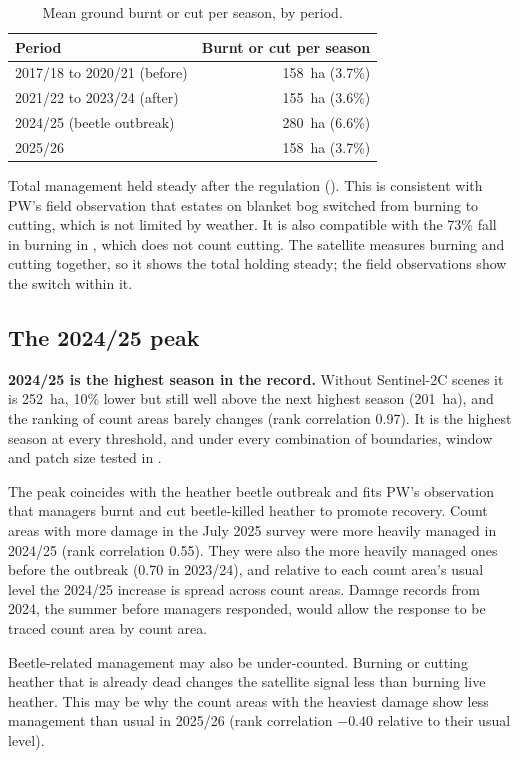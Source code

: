 \documentclass[11pt,a4paper]{article}
\begin{document}
\begin{table}[htbp]
\centering
\caption{Mean ground burnt or cut per season, by period.}\label{tab:regulation}
\small
\begin{tabular}{lr}
\toprule
Period & Burnt or cut per season \\
\midrule
2017/18 to 2020/21 (before) & 158~ha (3.7\%) \\
2021/22 to 2023/24 (after) & 155~ha (3.6\%) \\
2024/25 (beetle outbreak) & 280~ha (6.6\%) \\
2025/26 & 158~ha (3.7\%) \\
\bottomrule
\end{tabular}
\end{table}

Total management held steady after the regulation (). This is consistent with PW's field observation that estates on blanket bog switched from burning to cutting, which is not limited by weather. It is also compatible with the 73\% fall in burning in \citet{shewring2024}, which does not count cutting. The satellite measures burning and cutting together, so it shows the total holding steady; the field observations show the switch within it.

\subsection{The 2024/25 peak}\label{sec:2024}

\textbf{2024/25 is the highest season in the record.} Without Sentinel-2C scenes it is 252~ha, 10\% lower but still well above the next highest season (201~ha), and the ranking of count areas barely changes (rank correlation 0.97). It is the highest season at every threshold, and under every combination of boundaries, window and patch size tested in .

The peak coincides with the heather beetle outbreak and fits PW's observation that managers burnt and cut beetle-killed heather to promote recovery. Count areas with more damage in the July 2025 survey were more heavily managed in 2024/25 (rank correlation 0.55). They were also the more heavily managed ones before the outbreak (0.70 in 2023/24), and relative to each count area's usual level the 2024/25 increase is spread across count areas. Damage records from 2024, the summer before managers responded, would allow the response to be traced count area by count area.

Beetle-related management may also be under-counted. Burning or cutting heather that is already dead changes the satellite signal less than burning live heather. This may be why the count areas with the heaviest damage show less management than usual in 2025/26 (rank correlation $-0.40$ relative to their usual level).
\end{document}
